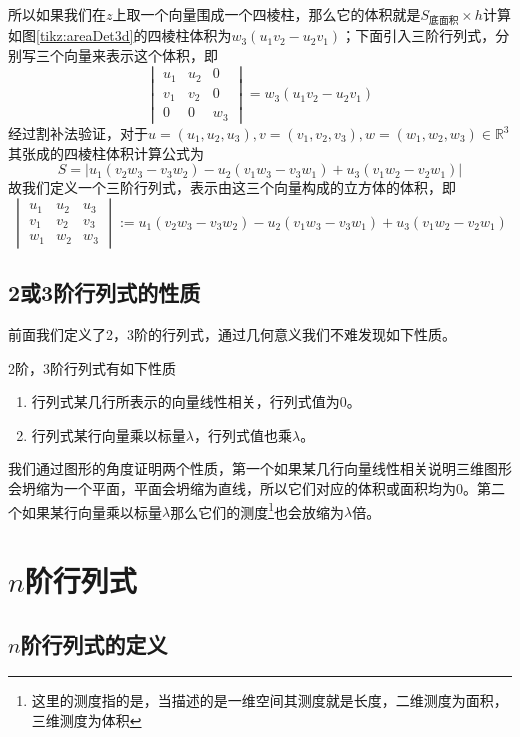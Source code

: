 所以如果我们在$z$上取一个向量围成一个四棱柱，那么它的体积就是$S_{\text{底面积}}\times h$计算如图\ref{tikz:areaDet3d}的四棱柱体积为$w_3(u_1v_2-u_2v_1)$；下面引入三阶行列式，分别写三个向量来表示这个体积，即$$\begin{vmatrix}
	u_1&u_2  &0 \\
	v_1&v_2  &0 \\
	0&0  &w_3 
  \end{vmatrix}=w_3(u_1v_2-u_2v_1)$$经过割补法验证，对于$u=(u_1,u_2,u_3),v=(v_1,v_2,v_3),w=(w_1,w_2,w_3) \in \mathbb{R}^3$其张成的四棱柱体积计算公式为$$S=|u_1(v_2w_3 - v_3w_2) - u_2(v_1w_3 - v_3w_1) + u_3(v_1w_2 - v_2w_1)|$$故我们定义一个三阶行列式，表示由这三个向量构成的立方体的体积，即$$\begin{vmatrix}
	u_1& u_2 &u_3 \\
	v_1& v_2 &v_3 \\
	w_1& w_2 &w_3
  \end{vmatrix}:=u_1(v_2w_3 - v_3w_2) - u_2(v_1w_3 - v_3w_1) + u_3(v_1w_2 - v_2w_1)$$

\subsection{2或3阶行列式的性质}

前面我们定义了2，3阶的行列式，通过几何意义我们不难发现如下性质。

\begin{corollary}
	2阶，3阶行列式有如下性质
	\begin{enumerate}
		\item 行列式某几行所表示的向量线性相关，行列式值为0。
		\item 行列式某行向量乘以标量$\lambda$，行列式值也乘$\lambda$。
	\end{enumerate}
\end{corollary}


我们通过图形的角度证明两个性质，第一个如果某几行向量线性相关说明三维图形会坍缩为一个平面，平面会坍缩为直线，所以它们对应的体积或面积均为0。第二个如果某行向量乘以标量$\lambda$那么它们的测度\footnote{这里的测度指的是，当描述的是一维空间其测度就是长度，二维测度为面积，三维测度为体积}也会放缩为$\lambda$倍。

\section{$n$阶行列式}

\subsection{$n$阶行列式的定义}

